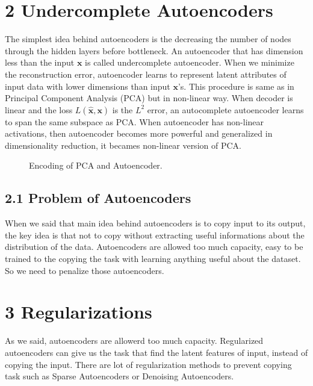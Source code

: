 \documentclass[11pt,twocolumn]{article}
\begin{document}
\section{2 Undercomplete Autoencoders}	
\hspace*{0.5cm} The simplest idea behind autoencoders is the decreasing the number of nodes through the hidden layers before bottleneck. An autoencoder that has dimension less than the input $\mathbf{x}$ is called undercomplete autoencoder. When we minimize the reconstruction error, autoencoder learns to represent latent attributes of input data with lower dimensions than input $\mathbf{x}$'s. This procedure is same as in Principal Component Analysis (PCA) but in non-linear way. When decoder is linear and the loss $L(\mathbf{\hat{x},\mathbf{x}})$ is the $L^2$ error, an autocomplete autoencoder learns to span the same subspace as PCA. When autoencoder has non-linear activations, then autoencoder becomes more powerful and generalized in dimensionality reduction, it becames non-linear version of PCA.
\begin{figure}[H]
\centering
{}
\caption{Encoding of PCA and Autoencoder.}
\end{figure}
\subsection{2.1 Problem of Autoencoders}
When we said that main idea behind autoencoders is to copy input to its output, the key idea is that not to copy without extracting useful informations about the distribution of the data. Autoencoders are allowed too much capacity, easy to be trained to the copying the task with learning anything useful about the dataset. So we need to penalize those autoencoders.

\section{3 Regularizations}
As we said, autoencoders are allowerd too much capacity. Regularized autoencoders can give us the task that find the latent features of input, instead of copying the input. There are lot of regularization methods to prevent copying task such as Sparse Autoencoders or Denoising Autoencoders. 
\end{document}
